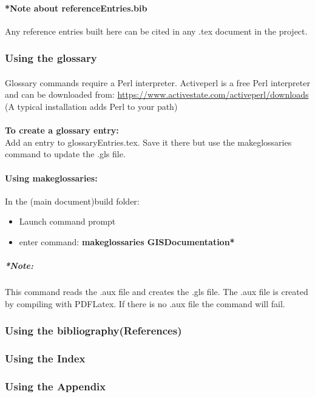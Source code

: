 \documentclass[class=book , crop=false]{standalone}
\begin{document}
\paragraph{*Note about referenceEntries.bib\\}
{\footnotesize Any reference entries built here can be cited in any .tex document in the project.}

\subsubsection{Using the glossary}
\paragraph{}
Glossary commands require a Perl interpreter.  Activeperl is a free Perl interpreter and can be downloaded from: \href{https://www.activestate.com/activeperl/downloads}{https://www.activestate.com/activeperl/downloads}
{\tiny (A typical installation adds Perl to your path)}

\paragraph{}%
\textbf{To create a glossary entry:}\\ Add an entry to glossaryEntries.tex.  Save it there but use the makeglossaries command to update the .gls file.

\paragraph{Using makeglossaries:}
In the (main document)build folder:
\begin{itemize}
\item Launch command prompt
\item enter command: \textbf{{\large makeglossaries GISDocumentation*}}
\end{itemize}
\subparagraph{*Note:} {\footnotesize This command reads the .aux file and creates the .gls file.  The .aux file is created by compiling with PDFLatex.  If there is no .aux file the command will fail.}

\subsubsection{Using the bibliography(References)}

\subsubsection{Using the Index}

\subsubsection{Using the Appendix}
\end{document}
